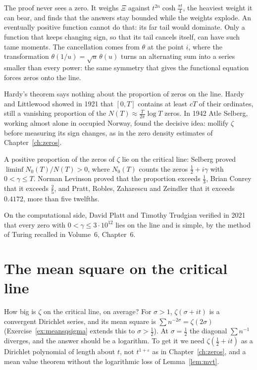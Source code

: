 \begin{beauty}
The proof never sees a zero. It weighs $\Xi$ against $t^{2n}\cosh\frac{\pi t}4$, the heaviest weight it can bear, and finds that the answers stay bounded while the weights explode. An eventually positive function cannot do that: its far tail would dominate. Only a function that keeps changing sign, so that its tail cancels itself, can have such tame moments. The cancellation comes from $\theta$ at the point $i$, where the transformation $\theta(1/u)=\sqrt u\,\theta(u)$ turns an alternating sum into a series smaller than every power: the same symmetry that gives the functional equation forces zeros onto the line.
\end{beauty}

Hardy's theorem says nothing about the proportion of zeros on the line. Hardy and Littlewood showed in 1921 that $[0,T]$ contains at least $cT$ of their ordinates, still a vanishing proportion of the $N(T)\approx\frac T{2\pi}\log T$ zeros. In 1942 Atle Selberg, working almost alone in occupied Norway, found the decisive idea: mollify $\zeta$ before measuring its sign changes, as in the zero density estimates of Chapter~\ref{ch:zeros}.

\begin{theorem}\label{thm:proportion}
A positive proportion of the zeros of $\zeta$ lie on the critical line: Selberg proved $\liminf N_0(T)/N(T)>0$, where $N_0(T)$ counts the zeros $\frac12+i\gamma$ with $0<\gamma\le T$. Norman Levinson proved that the proportion exceeds $\frac13$, Brian Conrey that it exceeds $\frac25$, and Pratt, Robles, Zaharescu and Zeindler that it exceeds $0.4172$, more than five twelfths.
\end{theorem}

On the computational side, David Platt and Timothy Trudgian verified in 2021 that every zero with $0<\gamma\le3\cdot10^{12}$ lies on the line and is simple, by the method of Turing recalled in Volume~6, Chapter~6.

\section{The mean square on the critical line}

How big is $\zeta$ on the critical line, on average? For $\sigma>1$, $\zeta(\sigma+it)$ is a convergent Dirichlet series, and its mean square is $\sum n^{-2\sigma}=\zeta(2\sigma)$ (Exercise~\ref{ex:meansqsigma} extends this to $\sigma>\frac12$). At $\sigma=\frac12$ the diagonal $\sum n^{-1}$ diverges, and the answer should be a logarithm. To get it we need $\zeta(\frac12+it)$ as a Dirichlet polynomial of length about $t$, not $t^{1+\varepsilon}$ as in Chapter~\ref{ch:zeros}, and a mean value theorem without the logarithmic loss of Lemma~\ref{lem:mvt}.

